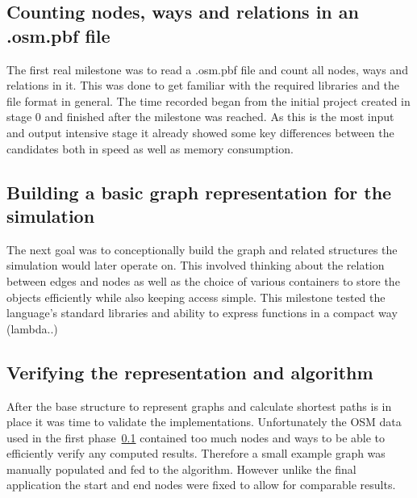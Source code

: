 \subsection{Counting nodes, ways and relations in an .osm.pbf file}
\label{subsec:Approach::Implementation::Counting}

The first real milestone was to read a .osm.pbf file and count all nodes, ways and relations in it. This was done to get familiar with the required libraries and the file format in general. The time recorded began from the initial project created in stage 0 and finished after the milestone was reached. As this is the most input and output intensive stage it already showed some key differences between the candidates both in speed as well as memory consumption.

\subsection{Building a basic graph representation for the simulation}
\label{subsec:Approach::Implementation::Graph_Representation}

The next goal was to conceptionally build the graph and related structures the simulation would later operate on. This involved thinking about the relation between edges and nodes as well as the choice of various containers to store the objects efficiently while also keeping access simple. This milestone tested the language's standard libraries and ability to express functions in a compact way (lambda..)

\subsection{Verifying the representation and algorithm}
\label{subsec:Approach::Implementation::Verifiying}

After the base structure to represent graphs and calculate shortest paths is in place it was time to validate the implementations. Unfortunately the OSM data used in the first phase~\ref{subsec:Approach::Implementation::Counting} contained too much nodes and ways to be able to efficiently verify any computed results. Therefore a small example graph was manually populated and fed to the algorithm. However unlike the final application the start and end nodes were fixed to allow for comparable results.
